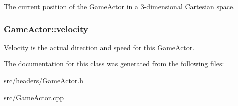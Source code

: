 The current position of the \hyperlink{class_game_actor}{Game\+Actor} in a 3-\/dimensional Cartesian space. \hypertarget{class_game_actor_a95518bf01411eafe983df8815e8682d1}{
\subsubsection[{velocity}]{ Game\+Actor\+::velocity\hspace{0.3cm}{\ttfamily [protected]}}}\label{class_game_actor_a95518bf01411eafe983df8815e8682d1}
Velocity is the actual direction and speed for this \hyperlink{class_game_actor}{Game\+Actor}. 

The documentation for this class was generated from the following files\+:\begin{DoxyCompactItemize}
\item 
src/headers/\hyperlink{_game_actor_8h}{Game\+Actor.\+h}\item 
src/\hyperlink{_game_actor_8cpp}{Game\+Actor.\+cpp}\end{DoxyCompactItemize}
